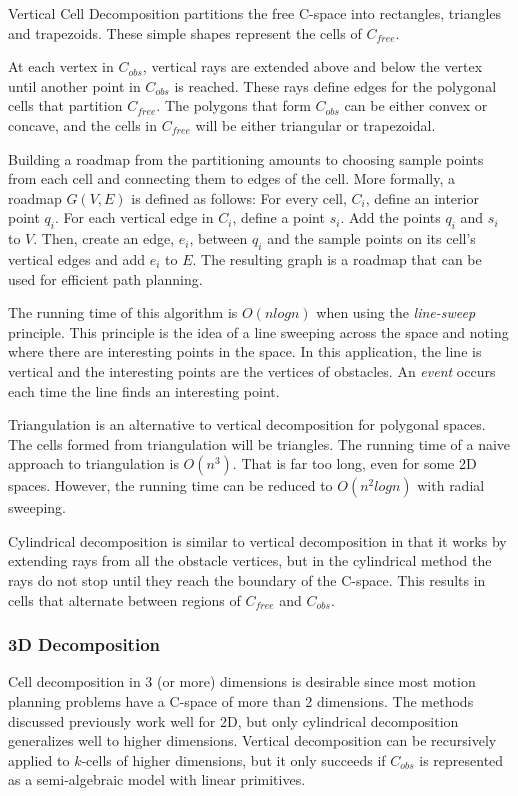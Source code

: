 \documentclass[10pt,conference]{ieeeconf}
\begin{document}
Vertical Cell Decomposition partitions the free C-space into rectangles, triangles and trapezoids. These simple shapes represent the cells of $C_{free}$. 

At each vertex in $C_{obs}$, vertical rays are extended above and below the vertex until another point in $C_{obs}$ is reached. These rays define edges for the polygonal cells that partition $C_{free}$. The polygons that form $C_{obs}$ can be either convex or concave, and the cells in $C_{free}$ will be either triangular or trapezoidal. 

Building a roadmap from the partitioning amounts to choosing sample points from each cell and connecting them to edges of the cell. More formally, a roadmap $G(V,E)$ is defined as follows: For every cell, $C_i$, define an interior point $q_i$. For each vertical edge in $C_i$, define a point $s_i$. Add the points $q_i$ and $s_i$ to $V$. Then, create an edge, $e_i$, between $q_i$ and the sample points on its cell's vertical edges and add $e_i$ to $E$. The resulting graph is a roadmap that can be used for efficient path planning.

The running time of this algorithm is $O(nlogn)$ when using the \emph{line-sweep} principle. This principle is the idea of a line sweeping across the space and noting where there are interesting points in the space. In this application, the line is vertical and the interesting points are the vertices of obstacles. An \emph{event} occurs each time the line finds an interesting point. 

Triangulation is an alternative to vertical decomposition for polygonal spaces. The cells formed from triangulation will be triangles. The running time of a naive approach to triangulation is $O(n^3)$. That is far too long, even for some 2D spaces. However, the running time can be reduced to $O(n^2logn)$ with radial sweeping.

Cylindrical decomposition is similar to vertical decomposition in that it works by extending rays from all the obstacle vertices, but in the cylindrical method the rays do not stop until they reach the boundary of the C-space. This results in cells that alternate between regions of $C_{free}$ and $C_{obs}$. 

\subsubsection{3D Decomposition}

Cell decomposition in 3 (or more) dimensions is desirable since most motion planning problems have a C-space of more than 2 dimensions. The methods discussed previously work well for 2D, but only cylindrical decomposition generalizes well to higher dimensions. Vertical decomposition can be recursively applied to $k$-cells of higher dimensions, but it only succeeds if $C_{obs}$ is represented as a semi-algebraic model with linear primitives. 
\end{document}
